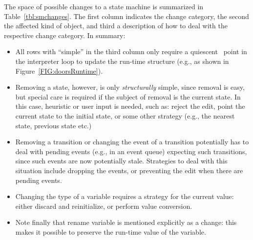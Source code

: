 \documentclass[english,crc]{programming}
\begin{document}
The space of possible %
changes to a state machine is summarized in Table~\ref{tbl:smchanges}.
The first column indicates the change category, the second the affected kind of object, and third
a description of how to deal with the respective change category. In summary:
\begin{itemize}
\item All rows with ``simple'' in the third column only require a quiescent~\cite{Tranquility} point in the interpreter loop to update the run-time structure (e.g., as shown in Figure~\ref{FIG:doorsRuntime}).
\item Removing a state, however, is only \textit{structurally} simple, since removal is easy, but special care is required if the subject of removal is the current state. In this case, heuristic or user input is needed, such as: reject the edit, point the current state to the initial state, or some other strategy (e.g., the nearest state, previous state etc.)
\item Removing a transition or changing the event of a transition potentially has to deal with pending events (e.g., in an event queue) expecting such transitions, since such events are now potentially stale. Strategies to deal with this situation include dropping the events, or preventing the edit when there are pending events.
\item Changing the type of a variable requires a strategy for the current value: either discard and reinitialize, or perform value conversion.
\item Note finally that rename variable is mentioned explicitly as a change: this makes it possible to preserve the run-time value of the variable.
\end{itemize}
\end{document}
